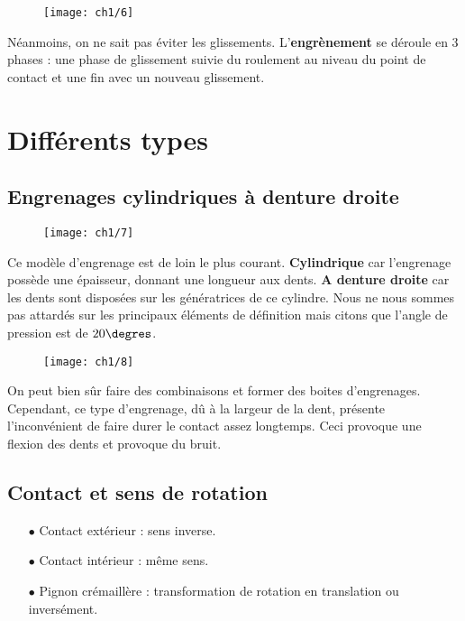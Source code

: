 \begin{wrapfigure}[5]{r}{5.6cm}
	\vspace{-5mm}
	\texttt{[image: ch1/6]}
\end{wrapfigure}	
\noindent Néanmoins, on ne sait pas éviter les glissements. L'\textbf{engrènement} se déroule en 3 phases : une phase de glissement suivie du roulement au niveau du point de contact et une fin avec un nouveau glissement. 

\section{Différents types}
\subsection{Engrenages cylindriques à denture droite}
\begin{wrapfigure}[5]{l}{2.5cm}
	\vspace{-5mm}
	\texttt{[image: ch1/7]}
\end{wrapfigure}	
\noindent Ce modèle d'engrenage est de loin le plus courant. \textbf{Cylindrique} car l'engrenage possède une épaisseur, donnant une longueur aux dents. \textbf{A denture droite} car les dents sont disposées sur les génératrices de ce cylindre. Nous ne nous sommes pas attardés sur les principaux éléments de définition mais citons que l'angle de pression est de $20\degres$. \\
	
\begin{wrapfigure}[5]{r}{2.5cm}
	\vspace{-5mm}
	\texttt{[image: ch1/8]}
\end{wrapfigure}	
\noindent On peut bien sûr faire des combinaisons et former des boites d'engrenages. Cependant, ce type d'engrenage, dû à la largeur de la dent, présente l'inconvénient de faire durer le contact assez longtemps. Ceci provoque une flexion des dents et provoque du bruit.
	
\subsection{Contact et sens de rotation}
\begin{itemize}
	\item[$\bullet$] Contact extérieur : sens inverse.
	\item[$\bullet$] Contact intérieur : même sens.
	\item[$\bullet$] Pignon crémaillère : transformation de rotation en translation ou inversément. 
\end{itemize}
	
